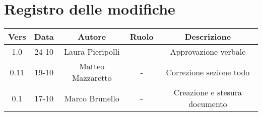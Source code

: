 \section{Registro delle modifiche}

\begin{table}[htbp]
	\begin{tabular}{|c|c|c|c|c|}
		\hline
		\rowcolor[gray]{0.9}
		Vers & Data & Autore & Ruolo & Descrizione \\
		\hline
		1.0 & 24-10 & Laura Pieripolli & - & Approvazione verbale \\
		\hline
		0.11 & 19-10 & Matteo Mazzaretto & - & Correzione sezione todo \\
		\hline
		0.1 & 17-10 & Marco Brunello & - & Creazione e stesura documento \\
		\hline
	\end{tabular}
\end{table}